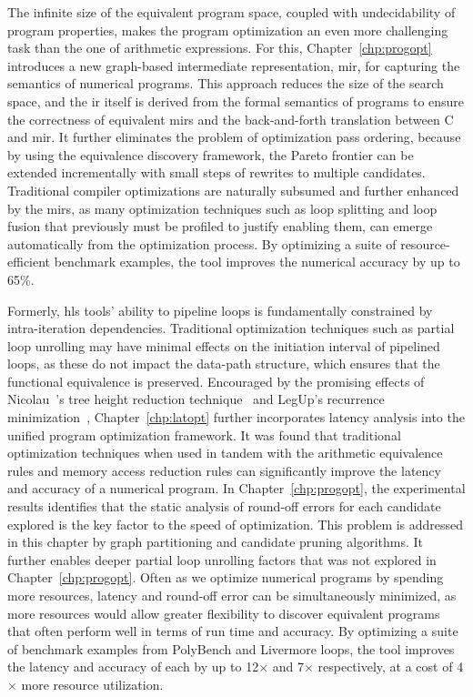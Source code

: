 The infinite size of the equivalent program space, coupled with undecidability
of program properties, makes the program optimization an even more
challenging task than the one of arithmetic expressions.  For this,
Chapter~\ref{chp:progopt} introduces a new graph-based intermediate
representation, \gls{mir}, for capturing the semantics of numerical programs.
This approach reduces the size of the search space, and the \gls{ir} itself
is derived from the formal semantics of programs to ensure the correctness
of equivalent \glspl{mir} and the back-and-forth translation between C and
\gls{mir}\@.  It further eliminates the problem of optimization pass ordering,
because by using the equivalence discovery framework, the Pareto frontier can
be extended incrementally with small steps of rewrites to multiple candidates.
Traditional compiler optimizations are naturally subsumed and further enhanced
by the \glspl{mir}, as many optimization techniques such as loop splitting and
loop fusion that previously must be profiled to justify enabling them, can
emerge automatically from the optimization process.  By optimizing a suite of
resource-efficient benchmark examples, the tool improves the numerical accuracy
by up to 65\%.

Formerly, \gls{hls} tools' ability to pipeline loops is fundamentally constrained
by intra-iteration dependencies.  Traditional optimization techniques such as
partial loop unrolling may have minimal effects on the initiation interval of
pipelined loops, as these do not impact the data-path structure, which ensures
that the functional equivalence is preserved.  Encouraged by the promising
effects of Nicolau~\etal's tree height reduction technique~\cite{nicolau91}
and LegUp's recurrence minimization~\cite{canis14}, Chapter~\ref{chp:latopt}
further incorporates latency analysis into the unified program optimization
framework.  It was found that traditional optimization techniques when used
in tandem with the arithmetic equivalence rules and memory access reduction
rules can significantly improve the latency and accuracy of a numerical
program.  In Chapter~\ref{chp:progopt}, the experimental results identifies
that the static analysis of round-off errors for each candidate explored is
the key factor to the speed of optimization.  This problem is addressed in
this chapter by graph partitioning and candidate pruning algorithms.  It
further enables deeper partial loop unrolling factors that was not explored in
Chapter~\ref{chp:progopt}.  Often as we optimize numerical programs by spending
more resources, latency and round-off error can be simultaneously minimized, as
more resources would allow greater flexibility to discover equivalent programs
that often perform well in terms of run time and accuracy.  By optimizing
a suite of benchmark examples from PolyBench and Livermore loops, the tool
improves the latency and accuracy of each by up to 12$\times$ and 7$\times$
respectively, at a cost of 4$\times$ more resource utilization.


